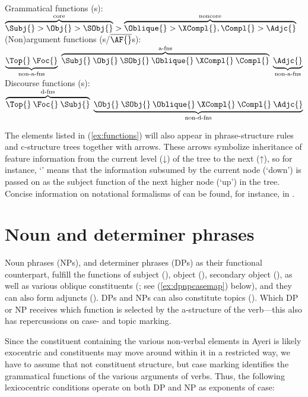 \pex\label{ex:functions}
\a\label{ex:gfs} Grammatical functions (\GF{}s):\\
	$\overbrace{\Subj{} > \Obj{} > \SObj{}}^{\text{core}} > 
	\overbrace{\Oblique{} > \XCompl{}, \Compl{} > \Adjc{}}^{\text{noncore}}$
\a\label{ex:nonafs} (Non)argument functions (\AF{}s/$\overline{\mbox{\AF{}}%
}$s):\\
	$\underbrace{\Top{}\: \Foc{}}_{\text{non-a-fns}}\; 
	\overbrace{\Subj{}\: \Obj{}\: \SObj{}\: \Oblique{}\: \XCompl{}\: 
		\Compl{}}^{\text{a-fns}}\; 
	\underbrace{\Adjc{}}_{\text{non-a-fns}}$
\a\label{ex:dfs} Discourse functions (\DF{}s):\\
	$\overbrace{\Top{}\: \Foc{}\: \Subj{}}^{\text{d-fns}}\;
	\underbrace{\Obj{}\: \SObj{}\: \Oblique{}\: \XCompl{}\: \Compl{}\: 
		\Adjc{}}_{\text{non-d-fns}}$
\xe

The elements listed in (\ref{ex:functions}) will also appear in
phrase-structure rules and c-structure trees together with arrows. These arrows
symbolize inheritance of feature information from the current level (↓) of the
tree to the next (↑), so for instance, `\pass{\Subj}' means that the information
subsumed by the current node (`down') is passed on as the subject function of
the next higher node (`up') in the tree. Concise information on notational
formalisms of \Lfg{} can be found, for instance, in \citet{buttking2015}.

\section{Noun and determiner phrases}
\label{sec:nps-dps}

Noun phrases (NPs), and determiner phrases (DPs) as their functional 
counterpart, fulfill the functions of subject (\Subj{}), object (\Obj{}), 
secondary object (\SObj{}), as well as various oblique constituents (\Oblique;
see (\ref{ex:dpnpcasemap}) below), and they can also form adjuncts (\Adjc{}).
DPs and NPs can also constitute topics (\Top{}). Which DP or NP receives which 
function is selected by the a-structure of the verb---this also has 
repercussions on case- and topic marking.

Since the constituent containing the various non-verbal elements in Ayeri is 
likely exocentric and constituents may move around within it in a restricted 
way, we have to assume that not constituent structure, but case marking 
identifies the grammatical functions of the various arguments of verbs. Thus, 
the following lexicocentric conditions operate on both DP and NP as exponents 
of case:

